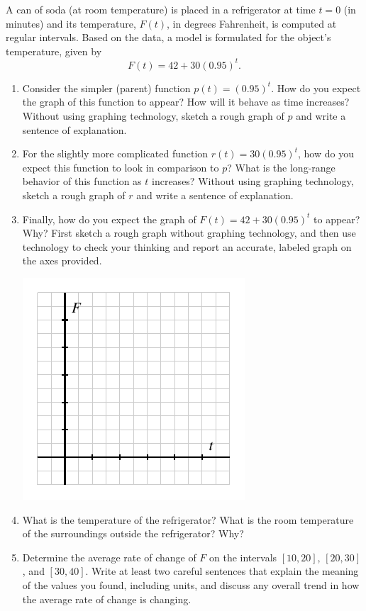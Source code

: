 \documentclass[nooutcomes]{ximera}
\begin{document}
\begin{exploration}
A can of soda (at room temperature) is placed in a refrigerator at time \(t = 0\) (in minutes) and its temperature, \(F(t)\), in degrees Fahrenheit, is computed at regular intervals. Based on the data, a model is formulated for the object's temperature, given by
\begin{equation*}
F(t) = 42 + 30(0.95)^{t}\text{.}
\end{equation*}
\begin{enumerate}[label=\alph*.]
\item Consider the simpler (parent) function \(p(t) = (0.95)^t\). How do you expect the graph of this function to appear? How will it behave as time increases? Without using graphing technology, sketch a rough graph of \(p\) and write a sentence of explanation.
\item For the slightly more complicated function \(r(t) = 30 (0.95)^{t}\), how do you expect this function to look in comparison to \(p\)?  What is the long-range behavior of this function as \(t\) increases? Without using graphing technology, sketch a rough graph of \(r\) and write a sentence of explanation.
\item Finally, how do you expect the graph of \(F(t) = 42 + 30(0.95)^{t}\) to appear? Why?  First sketch a rough graph without graphing technology, and then use technology to check your thinking and report an accurate, labeled graph on the axes provided.
\begin{image}
\includegraphics{modeling-F-t-blank-axes}
\end{image}
\item What is the temperature of the refrigerator? What is the room temperature of the surroundings outside the refrigerator? Why?
\item Determine the average rate of change of \(F\) on the intervals \([10,20]\), \([20,30]\), and \([30,40]\). Write at least two careful sentences that explain the meaning of the values you found, including units, and discuss any overall trend in how the average rate of change is changing.
\end{enumerate}
\end{exploration}
\end{document}
